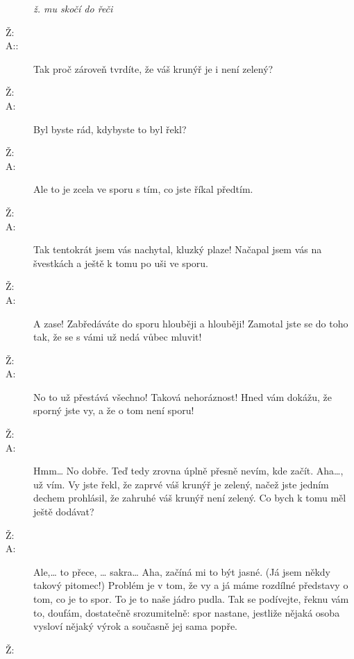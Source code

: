 \documentclass[12pt]{article}
\begin{document}
\begin{description}
    \bigskip
\textit{ž. mu skočí do řeči}
\item[Ž:]

\item[A::] Tak proč zároveň tvrdíte, že váš krunýř je i není zelený?

\item[Ž:]

\item[A:] Byl byste rád, kdybyste to byl řekl?

\item[Ž:]

\item[A:] Ale to je zcela ve sporu s tím, co jste říkal předtím.

\item[Ž:]

\item[A:] Tak tentokrát jsem vás nachytal, kluzký plaze! Načapal jsem vás na švestkách
    a ještě k tomu po uši ve sporu.

\item[Ž:]

\item[A:] A zase! Zabředáváte do sporu hlouběji a hlouběji! Zamotal jste  se do toho
    tak, že se s vámi už nedá vůbec mluvit!

\item[Ž:]

\item[A:] No to už přestává všechno! Taková nehoráznost! Hned vám dokážu, že
    sporný jste vy, a že o tom není sporu!

\item[Ž:]

\item[A:] Hmm… No dobře. Teď tedy zrovna úplně přesně nevím, kde začít.
    Aha…, už vím. Vy jste řekl, že zaprvé váš krunýř je zelený, načež jste jedním
    dechem prohlásil, že zahruhé váš krunýř není zelený. Co bych k tomu měl
    ještě dodávat?

\item[Ž:]

\item[A:] Ale,… to přece, … sakra… Aha, začíná mi to být jasné. (Já jsem někdy takový
    pitomec!) Problém je v tom, že vy a já máme rozdílné představy o tom, co je to spor.
    To je to naše jádro pudla. Tak se podívejte, řeknu vám to, doufám, dostatečně
    srozumitelně: spor nastane, jestliže nějaká osoba vysloví nějaký výrok a současně
    jej sama popře.

\item[Ž:]


\end{description}
\end{document}
